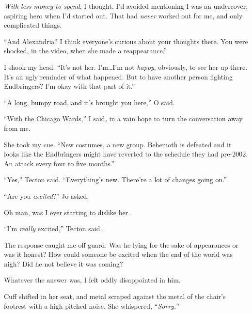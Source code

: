 \emph{With less money to spend}, I thought.  I'd avoided mentioning I was an undercover, aspiring hero when I'd started out.  That had \emph{never} worked out for me, and only complicated things.



``And Alexandria?  I think everyone's curious about your thoughts there.  You were shocked, in the video, when she made a reappearance.''



I shook my head.  ``It's not her.  I'm\ldots I'm not \emph{happy}, obviously, to see her up there.  It's an ugly reminder of what happened.  But to have another person fighting Endbringers?  I'm okay with that part of it.''



``A long, bumpy road, and it's brought you here,'' O said.



``With the Chicago Wards,'' I said\emph{, }in a vain hope to turn the conversation away from me.



She took my cue.  ``New costumes, a new group.  Behemoth is defeated and it looks like the Endbringers might have reverted to the schedule they had pre-2002.  An attack every four to five months.''



``Yes,'' Tecton said.  ``Everything's new.  There're a lot of changes going on.''



``Are you \emph{excited}?'' Jo asked.



Oh man, was I ever starting to dislike her.



``I'm \emph{really} excited,'' Tecton said.



The response caught me off guard.  Was he lying for the sake of appearances or was it honest?  How could someone be excited when the end of the world was nigh?  Did he not believe it was coming?



Whatever the answer was, I felt oddly disappointed in him.



Cuff shifted in her seat, and metal scraped against the metal of the chair's footrest with a high-pitched noise.  She whispered, ``\emph{Sorry.}''



